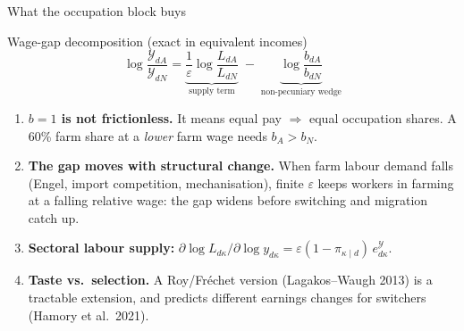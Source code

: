 \documentclass[10pt,aspectratio=169]{beamer}
\newcommand{\hl}[1]{\textcolor{mOrange}{#1}}
\begin{document}
\begin{frame}{What the occupation block buys}
  \begin{block}{Wage-gap decomposition (exact in equivalent incomes)}
    \vspace{-0.6em}
    \begin{equation*}
      \log\frac{\mathcal Y_{dA}}{\mathcal Y_{dN}}
      =\underbrace{\frac1\varepsilon\log\frac{L_{dA}}{L_{dN}}}_{\text{supply term}}
      \;-\;\underbrace{\log\frac{b_{dA}}{b_{dN}}}_{\text{non-pecuniary wedge}}
    \end{equation*}
  \end{block}
  \small
  \begin{enumerate}
    \item \textbf{$b=1$ is not frictionless.} It means equal pay $\Rightarrow$ equal
          occupation shares. A 60\% farm share at a \emph{lower} farm wage needs
          $b_A>b_N$.
    \item \textbf{The gap moves with structural change.} When farm labour demand falls
          (Engel, import competition, mechanisation), finite $\varepsilon$ keeps workers
          in farming at a falling relative wage: the gap \hl{widens} before switching and
          migration catch up.
    \item \textbf{Sectoral labour supply:}
          $\partial\log L_{d\kappa}/\partial\log y_{d\kappa}=\varepsilon(1-\pi_{\kappa\mid d})\,e^{\mathcal Y}_{d\kappa}$.
    \item \textbf{Taste vs.\ selection.} A Roy/Fr\'echet version (Lagakos--Waugh 2013)
          is a tractable extension, and predicts different earnings changes for switchers
          (Hamory et al.\ 2021).
  \end{enumerate}
\end{frame}
\end{document}
